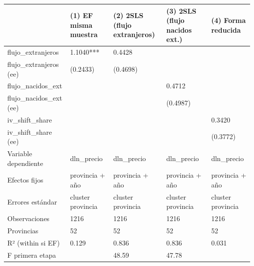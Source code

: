 \begin{tabular}{lllll}
\toprule
 & (1) EF misma muestra & (2) 2SLS (flujo extranjeros) & (3) 2SLS (flujo nacidos ext.) & (4) Forma reducida \\
\midrule
flujo\_extranjeros & 1.1040*** & 0.4428 &  &  \\
flujo\_extranjeros (ee) & (0.2433) & (0.4698) &  &  \\
flujo\_nacidos\_ext &  &  & 0.4712 &  \\
flujo\_nacidos\_ext (ee) &  &  & (0.4987) &  \\
iv\_shift\_share &  &  &  & 0.3420 \\
iv\_shift\_share (ee) &  &  &  & (0.3772) \\
Variable dependiente & dln\_precio & dln\_precio & dln\_precio & dln\_precio \\
Efectos fijos & provincia + año & provincia + año & provincia + año & provincia + año \\
Errores estándar & cluster provincia & cluster provincia & cluster provincia & cluster provincia \\
Observaciones & 1216 & 1216 & 1216 & 1216 \\
Provincias & 52 & 52 & 52 & 52 \\
R² (within si EF) & 0.129 & 0.836 & 0.836 & 0.031 \\
F primera etapa &  & 48.59 & 47.78 &  \\
\bottomrule
\end{tabular}
